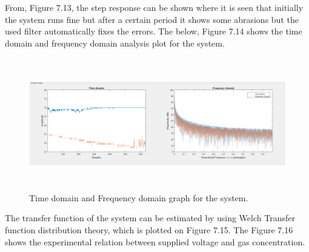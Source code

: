 \begin{enumerate}[label=\roman*]

\par

\par

\begin{justify}
From, Figure 7.13, the step response can be shown where it is seen that initially the system runs fine but after a certain period it shows some abrasions but the used filter automatically fixes the errors. The below, Figure 7.14 shows the time domain and frequency domain analysis plot for the system.
\end{justify}\par




\begin{figure}[H]
	\begin{Center}
		\includegraphics[width=6.53in,height=2.27in]{28}
		\caption{Time domain and Frequency domain graph for the system.}
		\label{fig:_14_Time_domain_and_Frequency_domain_graph_for_the_system}
	\end{Center}
\end{figure}



\par

\par

\begin{justify}
The transfer function of the system can be estimated by using Welch Transfer function distribution theory, which is plotted on Figure 7.15. The Figure 7.16 shows the experimental relation between supplied voltage and gas concentration.
\end{justify}\par




\end{enumerate}
